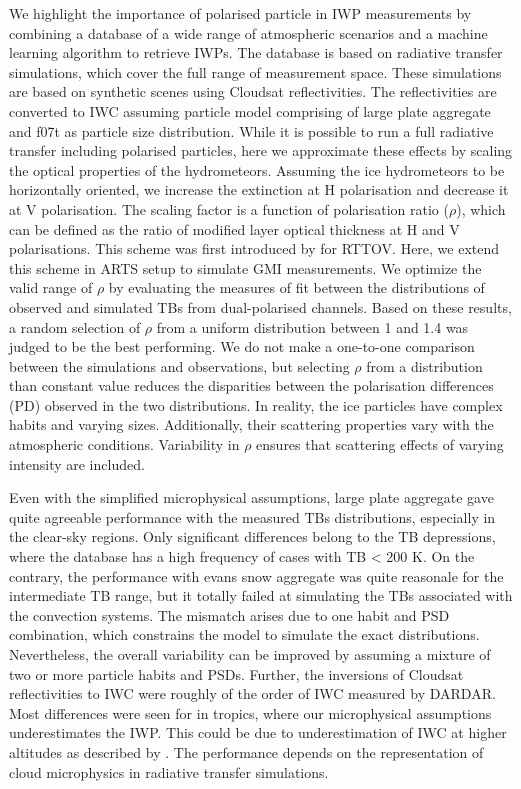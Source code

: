 \documentclass[amt, manuscript]{copernicus}
\begin{document}
We highlight the importance of polarised particle in IWP measurements by combining a database of a wide range of atmospheric scenarios and a machine learning algorithm to retrieve IWPs. The database is based on radiative transfer simulations, which  cover the full range of measurement space. These simulations are based on synthetic scenes using Cloudsat reflectivities. The reflectivities are converted to IWC assuming particle model comprising of large plate aggregate and f07t as particle size distribution. While it is possible to run a full radiative transfer including polarised particles, here we approximate these effects by scaling the optical properties of the hydrometeors. Assuming the ice hydrometeors to be horizontally oriented, we increase the extinction at H polarisation and decrease it at V polarisation. The scaling factor is a function of polarisation ratio ($\rho$), which can be defined as the ratio of modified layer optical thickness at H  and V  polarisations. This scheme was first introduced by \citet{barlakas:intro:21} for RTTOV. Here, we extend this scheme in ARTS setup to simulate GMI measurements. We optimize the valid range of $\rho$ by evaluating the measures of fit between the distributions of observed and simulated TBs from dual-polarised channels. Based on these results, a random selection of $\rho$ from a uniform distribution between 1 and 1.4  was judged to be the best performing. We do not make a one-to-one comparison between the simulations and observations, but selecting $\rho$ from a distribution than constant value reduces the disparities between the polarisation differences (PD) observed in the two distributions. In reality, the ice particles have complex habits and varying sizes. Additionally, their scattering properties vary with the atmospheric conditions. Variability in $\rho$ ensures that scattering effects of varying intensity are included. 

Even with the simplified microphysical assumptions, large plate aggregate gave quite agreeable performance with the measured TBs distributions, especially in the clear-sky regions. Only significant differences belong to the TB depressions, where the database has a high frequency of cases with TB < 200\,\,K. On the contrary, the performance with evans snow aggregate was quite reasonale for the intermediate TB range, but it totally failed at simulating the TBs associated with the convection systems. The mismatch arises due to one habit and PSD combination, which constrains the model to simulate the exact distributions. Nevertheless, the overall variability can be improved by assuming a mixture of two or more particle habits and PSDs. Further, the inversions of Cloudsat reflectivities to IWC were roughly of the order of IWC measured by DARDAR. Most differences were seen for in tropics, where our microphysical assumptions underestimates the IWP. This could be due to underestimation of IWC at higher altitudes as described by \citet{ekelund2020using}. The performance depends on the representation of cloud microphysics in radiative transfer simulations.  
\end{document}
